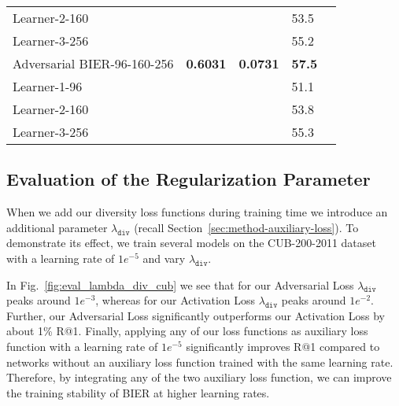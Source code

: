 \documentclass[10pt,journal,compsoc]{IEEEtran}
\begin{document}
\begin{table}[htbp]
\begin{tabular}{lllll}
        \hspace{2mm}  Learner-2-160      &                  &                     & 53.5 \\
        \hspace{2mm}  Learner-3-256      &                  &                     & 55.2 \\
        \hline
        Adversarial BIER-96-160-256    & \textbf{0.6031} & \textbf{0.0731}           & \textbf{57.5}  \\
        \hspace{2mm} Learner-1-96                      &            &                  & 51.1 \\
        \hspace{2mm} Learner-2-160                      &            &                  & 53.8 \\
        \hspace{2mm} Learner-3-256                      &            &                  & 55.3 \\
        \hline
    \end{tabular}
\end{table}\subsection{Evaluation of the Regularization Parameter}\label{sec:eval-regularization-lambda}

When we add our diversity loss functions during training time we introduce an 
additional parameter $\lambda_{\texttt{div}}$ (recall Section~\ref{sec:method-auxiliary-loss}). To demonstrate its effect, we train several models on the 
CUB-200-2011 dataset~\cite{WahCUB_200_2011} with a learning rate of $1e^{-5}$ and vary $\lambda_{\texttt{div}}$.

In Fig.~\ref{fig:eval_lambda_div_cub} we see that for our Adversarial Loss $\lambda_{\texttt{div}}$ peaks around $1e^{-3}$, whereas
for our Activation Loss $\lambda_{\texttt{div}}$ peaks around $1e^{-2}$. Further, our Adversarial Loss significantly outperforms our 
Activation Loss by about 1\% R@1. Finally, applying any of our loss functions as auxiliary loss function with a learning rate of $1e^{-5}$ 
significantly improves R@1 compared to networks without an auxiliary loss function trained with the same learning rate.
Therefore, by integrating any of the two auxiliary loss function, we can improve the training stability of \ac{BIER} at higher learning rates.
\end{document}
